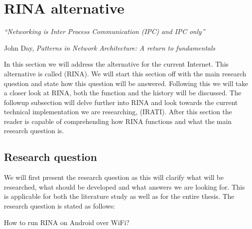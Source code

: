 \section{RINA alternative}
\label{sec:RINAalternative}
\epigraph{\emph{``Networking is Inter Process Communication (IPC) and IPC only''}}{John Day, \emph{Patterns in Network Architecture: A return to fundamentals}}

In this section we will address the alternative for the current Internet. This alternative is called  (RINA). We will start this section off with the main research question and state how this question will be answered. Following this we will take a closer look at RINA, both the function and the history will be discussed. The followup subsection will delve further into RINA and look towards the current technical implementation we are researching,  (IRATI). After this section the reader is capable of comprehending how RINA functions and what the main research question is. 

\subsection{Research question}
\label{ssec:research_question}
We will first present the research question as this will clarify what will be researched, what should be developed and what answers we are looking for. This is applicable for both the literature study as well as for the entire thesis. 
\npar
The research question is stated as follows: \\
\begin{highlight}How to run RINA on Android over WiFi?\end{highlight}

